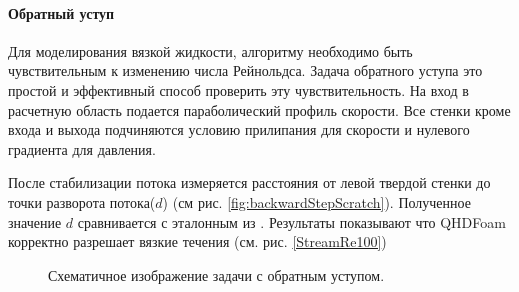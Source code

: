 \paragraph{Обратный уступ}

Для моделирования вязкой жидкости, алгоритму необходимо быть чувствительным к изменению числа Рейнольдса. Задача обратного уступа это простой и эффективный способ проверить эту чувствительность. На вход в расчетную область подается параболический профиль скорости. Все стенки кроме входа и выхода подчиняются условию прилипания для скорости и нулевого градиента для давления. 

После стабилизации потока измеряется расстояния от левой твердой стенки до точки разворота потока($d$) (см рис. \ref{fig:backwardStepScratch}). Полученное значение $d$ сравнивается с эталонным из \cite{ElizarBook}. Результаты показывают что QHDFoam корректно разрешает вязкие течения (см. рис. \ref{StreamRe100})

\begin{figure}[!h]
    \centering
    \caption{Схематичное изображение задачи с обратным уступом.}
    \label{fig:backwardStepSketch}
\end{figure}

